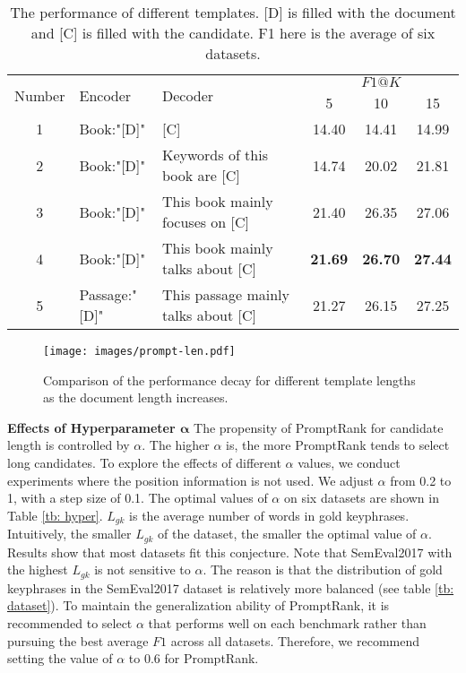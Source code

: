 \documentclass[11pt]{article}
\begin{document}
\begin{table*}
\centering
{}
\begin{tabular}{cllccc} 
\toprule
\multirow{2}{*}{Number} & \multirow{2}{*}{Encoder} & \multirow{2}{*}{Decoder}               & \multicolumn{3}{c}{$F1@K$}  \\ 
\cline{4-6}
                        &                          &                                        & 5     & 10    & 15        \\ 
\midrule
1                       & Book:"[D]"               & {[}C]                                  & 14.40 & 14.41 & 14.99     \\
2                       & Book:"[D]"               & Keywords of this book are [C]          & 14.74 & 20.02 & 21.81     \\
3                       & Book:"[D]"               & This book mainly focuses on [C] & 21.40 & 26.35 & 27.06     \\
4                       & Book:"[D]"               & This book mainly talks about [C]       &\textbf{21.69} & \textbf{26.70} & \textbf{27.44}     \\
5                       & Passage:"[D]"           & This passage mainly talks about [C]    & 21.27 & 26.15 & 27.25     \\
\bottomrule
\end{tabular}
\caption{The performance of different templates. [D] is filled with the document and [C] is filled with the candidate. F1 here is the average of six datasets.}
\label{tb: prompt}
\end{table*}

\begin{figure}[t]
\centerline{\texttt{[image: images/prompt-len.pdf]}}
\caption{Comparison of the performance decay for different template lengths as the document length increases.} 
\label{fg: template-len}
\end{figure}

\noindent
{\bf Effects of Hyperparameter $\bm{\alpha}$} The propensity of PromptRank for candidate length is controlled by $\alpha$. The higher $\alpha$ is, the more PromptRank tends to select long candidates. To explore the effects of different $\alpha$ values, we conduct experiments where the position information is not used. We adjust $\alpha$ from 0.2 to 1, with a step size of 0.1. The optimal values of $\alpha$ on six datasets are shown in Table \ref{tb: hyper}. $L_{gk}$ is the average number of words in gold keyphrases. Intuitively, the smaller $L_{gk}$ of the dataset, the smaller the optimal value of $\alpha$. Results show that most datasets fit this conjecture. Note that SemEval2017 with the highest $L_{gk}$ is not sensitive to $\alpha$. The reason is that the distribution of gold keyphrases in the SemEval2017 dataset is relatively more balanced (see table \ref{tb: dataset}). To maintain the generalization ability of PromptRank, it is recommended to select $\alpha$ that performs well on each benchmark rather than pursuing the best average $F1$ across all datasets. Therefore, we recommend setting the value of $\alpha$ to 0.6 for PromptRank.
\end{document}
